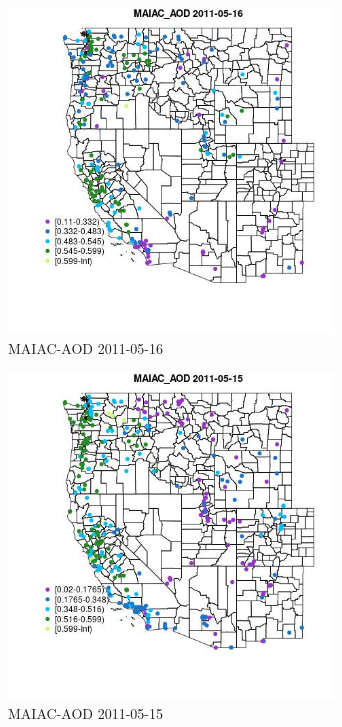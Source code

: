\begin{figure} 
\centering  
\includegraphics[width=0.77\textwidth]{Code_Outputs/ML_input_report_ML_input_PM25_Step5_part_d_de_duplicated_aves_ML_input_MapObsMAIAC_AOD2011-05-16.jpg} 
\caption{\label{fig:ML_input_report_ML_input_PM25_Step5_part_d_de_duplicated_aves_ML_inputMapObsMAIAC_AOD2011-05-16}MAIAC-AOD 2011-05-16} 
\end{figure} 
 

\begin{figure} 
\centering  
\includegraphics[width=0.77\textwidth]{Code_Outputs/ML_input_report_ML_input_PM25_Step5_part_d_de_duplicated_aves_ML_input_MapObsMAIAC_AOD2011-05-15.jpg} 
\caption{\label{fig:ML_input_report_ML_input_PM25_Step5_part_d_de_duplicated_aves_ML_inputMapObsMAIAC_AOD2011-05-15}MAIAC-AOD 2011-05-15} 
\end{figure} 
 


